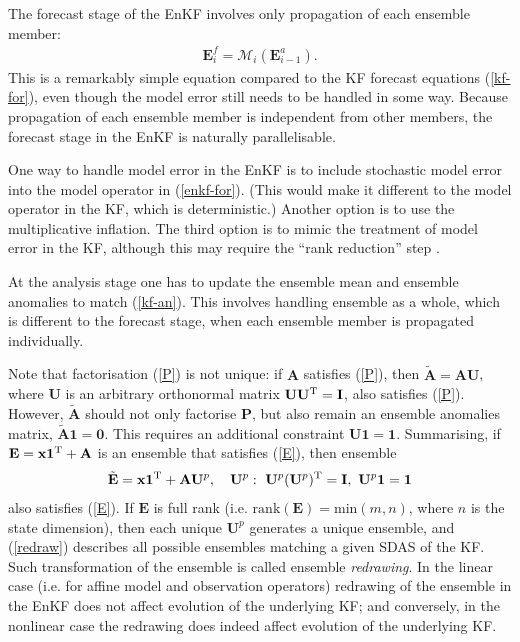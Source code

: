 \documentclass[11pt]{report}
\newcommand{\mb} {\mathbf}
\newcommand{\T}{^{\tiny \mathrm T}}
\begin{document}
The forecast stage of the EnKF involves only propagation of each ensemble member:
\begin{align}
  \label{enkf-for}
  \mb E_i^f = \mathcal M_i(\mb E_{i-1}^a).
\end{align}
This is a remarkably simple equation compared to the KF forecast equations (\ref{kf-for}), even though the model error still needs to be handled in some way.
Because propagation of each ensemble member is independent from other members, the forecast stage in the EnKF is naturally parallelisable.

One way to handle model error in the EnKF is to include stochastic model error into the model operator in (\ref{enkf-for}).
(This would make it different to the model operator in the KF, which is deterministic.)
Another option is to use the multiplicative inflation.
The third option is to mimic the treatment of model error in the KF, although this may require the ``rank reduction'' step \citep[eq. 28]{ver97a}.

At the analysis stage one has to update the ensemble mean and ensemble anomalies to match (\ref{kf-an}).
This involves handling ensemble as a whole, which is different to the forecast stage, when each ensemble member is propagated individually.

Note that factorisation (\ref{P}) is not unique: if $\mb A$ satisfies (\ref{P}), then $\tilde {\mb A} = \mb A \mb U$, where $\mb U$ is an arbitrary orthonormal matrix $\mb U \mb U\T = \mb I$, also satisfies (\ref{P}).
However, $\tilde{\mb A}$ should not only factorise $\mb P$, but also remain an ensemble anomalies matrix, $\tilde{\mb A} \mb 1 = \mb 0$.
This requires an additional constraint $\mb U \mb 1 = \mb 1$.
Summarising, if $\mb E = \mb x \mb 1\T + \mb A$ is an ensemble that satisfies (\ref{E}), then ensemble
\begin{align}
  \label{redraw}
  \tilde{\mb E} = \mb x \mb 1\T + \mb A \mb U^p, \quad \mb U^p:\ \mb U^p (\mb U^p)\T = \mb I,\ \mb U^p \mb 1 = \mb 1
\end{align}
also satisfies (\ref{E}). 
If $\mb E$ is full rank (i.e. $\mathrm{rank}(\mb E) = \mathrm{min}(m, n)$, where $n$ is the state dimension), then each unique $\mb U^p$ generates a unique ensemble, and (\ref{redraw}) describes all possible ensembles matching a given SDAS of the KF.
Such transformation of the ensemble is called ensemble \emph{redrawing}.
In the linear case (i.e. for affine model and observation operators) redrawing of the ensemble in the EnKF does not affect evolution of the underlying KF; and conversely, in the nonlinear case the redrawing does indeed affect evolution of the underlying KF.
\end{document}

